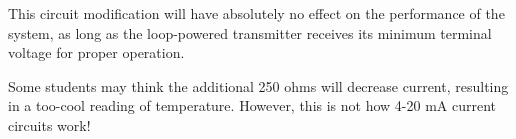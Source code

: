 This circuit modification will have absolutely no effect on the performance of the system, as long as the loop-powered transmitter receives its minimum terminal voltage for proper operation.







Some students may think the additional 250 ohms will decrease current, resulting in a too-cool reading of temperature.  However, this is not how 4-20 mA current circuits work!




